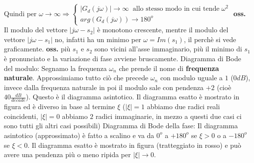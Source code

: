 \begin{itemize}
\begin{itemize}
        Quindi per $\omega \rightarrow  \infty \Rightarrow \begin{cases}
            |G_d(j \omega)| \rightarrow \infty \;\;\text{allo stesso modo in cui tende}\;\omega^2\\
            arg(G_d(j \omega)) \rightarrow  180^o
        \end{cases}$ \newline
        \newline
        \newline
        \textbf{oss.} Il modulo del vettore $|j \omega - s_2|$ è monotono crescente, mentre il modulo del vettore $|j \omega - s_1|$ no, infatti ha un minimo per $\omega = Im(s_1)$, il perchè si vede graficamente.\newline
        \newline
        \textbf{oss.} più $s_1$ e $s_2$ sono vicini all'asse immaginario, più il minimo di $s_1$ è pronunciato e la variazione di fase avviene bruscamente.\newline
        \newline
        \newline
        Diagramma di Bode del modulo: Segnamo la frequenza $\omega_n$ che prende il nome di \textbf{frequenza naturale}. Approssimiamo tutto ciò che precede $\omega_n$ con modulo uguale a $1$ ($0dB$), invece dalla frequenza naturale in poi il modulo sale con pendenza $+2$ (cioè $40 \frac{dB}{decade}$). Questo è il diagramma asintotico. Il diagramma esatto è mostrato in figura ed è diverso in base al termine $\xi$ ($|\xi| = 1$ abbiamo due radici reali coincidenti, $|\xi| = 0$ abbiamo $2$ radici immaginarie, in mezzo a questi due casi ci sono tutti gli altri casi possibili)\newline
        \newline
        \newline
        Diagramma di Bode della fase: Il diagramma asintotico (approssimato) è fatto a scalino e va da $0^o$ a $+ 180^o$ se $\xi > 0$ o a $-180^o$ se $\xi < 0$. Il diagramma esatto è mostrato in figura (tratteggiato in rosso) e può avere una pendenza più o meno ripida per $|\xi| \rightarrow 0$.
    \end{itemize} 
\end{itemize}
